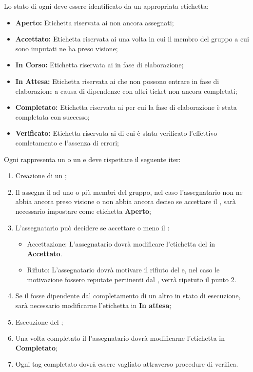 \documentclass[12pt,a4paper]{article}
\begin{document}
Lo stato di ogni \textit{} deve essere identificato da un appropriata etichetta:
\begin{itemize}
  \item \textbf{Aperto:} Etichetta riservata ai \textit{} non ancora assegnati;
  \item \textbf{Accettato:} Etichetta riservata ai \textit{} una volta in cui il membro del gruppo a cui sono imputati ne ha preso visione;
  \item \textbf{In Corso:} Etichetta riservata ai \textit{} in fase di elaborazione;
  \item \textbf{In Attesa:} Etichetta riservata ai \textit{} che non possono entrare in fase di elaborazione a causa di dipendenze con altri ticket non ancora completati;
  \item \textbf{Completato:} Etichetta riservata ai \textit{} per cui la fase di elaborazione è stata completata con successo;
  \item \textbf{Verificato:} Etichetta riservata ai \textit{} di cui è stata verificato l'effettivo comletamento e l'assenza di errori;
\end{itemize}

Ogni \textit{} rappresenta un  o un \textit{} e deve rispettare il seguente iter:

\begin{enumerate}
  \item Creazione di un \textit{};
  \item Il \PM{} assegna il \textit{} ad uno o più membri del gruppo, nel caso l'assegnatario non ne abbia ancora preso visione o non abbia ancora deciso se accettare il \textit{}, sarà necessario impostare come etichetta \textbf{Aperto};  
    \item L'assegnatario può decidere se accettare o meno il \textit{}:
    	\begin{itemize}
    	\item Accettazione: L'assegnatario dovrà modificare l'etichetta del \textit{} in \textbf{Accettato}.
    	\item Rifiuto: L'assegnatario dovrà motivare il rifiuto del \textit{} e, nel caso le motivazione fossero reputate pertinenti dal \PM{}, verrà ripetuto il punto 2. 
    	\end{itemize}
	\item Se il \textit{} fosse dipendente dal completamento di un altro \textit{} in stato di esecuzione, sarà necessario modificarne l'etichetta in \textbf{In attesa};
	\item Esecuzione del \textit{};
	\item Una volta completato il \textit{} l'assegnatario dovrà modificarne l'etichetta in \textbf{Completato};
	\item Ogni tag completato dovrà essere vagliato attraverso procedure di verifica. 
\end{enumerate}
\end{document}
